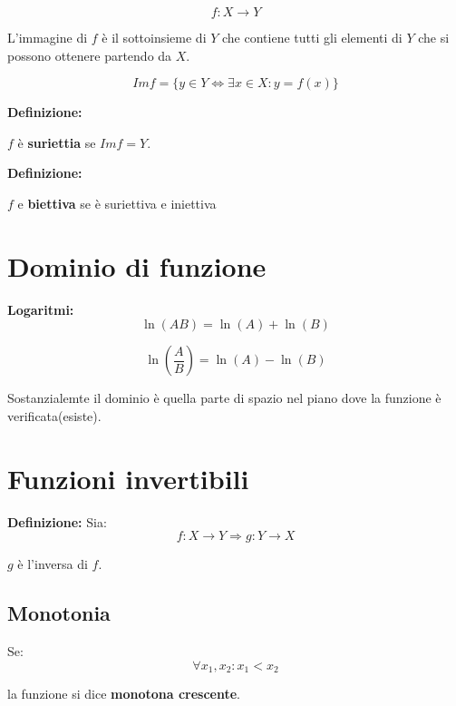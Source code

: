 \documentclass{article}
\begin{document}
\begin{equation*}
    f : X \rightarrow Y
\end{equation*}

L'immagine di $f$ è il sottoinsieme di $Y$ che contiene tutti gli elementi di $Y$ che si possono ottenere partendo da $X$.

\begin{equation*}
    Im f = \{y \in Y \Leftrightarrow \exists x \in X : y=f(x)\}
\end{equation*}

\textbf{Definizione:}

$f$ è \textbf{suriettia} se $Im f = Y$.

\textbf{Definizione:}

$f$ e \textbf{biettiva} se è suriettiva e iniettiva


\section{Dominio di funzione}

\textbf{Logaritmi:}
\begin{equation}
    \ln(AB) = \ln(A)+\ln(B)
\end{equation}

\begin{equation}
    \ln(\frac{A}{B}) = \ln(A)-\ln(B)
\end{equation}

Sostanzialemte il dominio è quella parte di spazio nel piano dove la funzione è verificata(esiste).



\section{Funzioni invertibili}
\textbf{Definizione:}
Sia:
\begin{equation*}
    f:X \rightarrow Y \Rightarrow g:Y\rightarrow X
\end{equation*} 

$g$ è l'inversa di $f$.

\subsection{Monotonia}

Se:
\begin{equation*}
    \forall x_1,x_2 : x_1<x_2
\end{equation*}

la funzione si dice \textbf{monotona crescente}.
\end{document}

